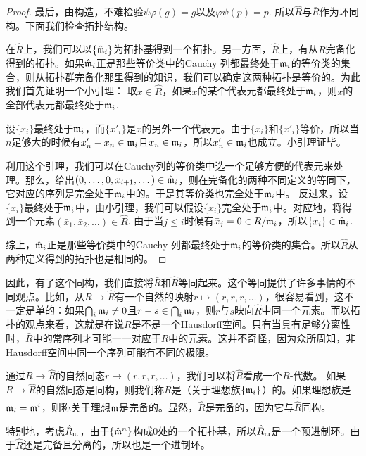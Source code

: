 \begin{proof}
	最后，由构造，不难检验$\psi\varphi(g)=g$以及$\varphi\psi(p)=p$. 所以$\hat R$与$\bar R$作为环同构。下面我们检查拓扑结构。

	在$\hat R$上，我们可以以$\{\hat {\mathfrak{m}}_i\}$为拓扑基得到一个拓扑。另一方面，$\hat R$上，有从$R$完备化得到的拓扑。如果$\hat {\mathfrak{m}}_i$正是那些等价类中的Cauchy 列都最终处于$\mathfrak{m}_i$的等价类的集合，则从拓扑群完备化那里得到的知识，我们可以确定这两种拓扑是等价的。为此我们首先证明一个小引理：
	取$x\in \hat R$，如果$x$的某个代表元都最终处于$\mathfrak{m}_i$，则$x$的全部代表元都最终处于$\mathfrak{m}_i$.
	
	设$\{x_i\}$最终处于$\mathfrak{m}_i$，而$\{x'_i\}$是$x$的另外一个代表元。由于$\{x_i\}$和$\{x'_i\}$等价，所以当$n$足够大的时候有$x'_n-x_n\in \mathfrak{m}_i$且$x_n\in \mathfrak{m}_i$，所以$x'_n\in \mathfrak{m}_i$也成立。小引理证毕。
		
	利用这个引理，我们可以在Cauchy列的等价类中选一个足够方便的代表元来处理。那么，给出$(0,\dots,0,x_{i+1},\dots)\in \hat{\mathfrak{m}}_i$，则在完备化的两种不同定义的等同下，它对应的序列是完全处于$\mathfrak{m}_i$中的。于是其等价类也完全处于$\mathfrak{m}_i$中。
	反过来，设$\{x_i\}$最终处于$\mathfrak{m}_i$中，由小引理，我们可以假设$\{x_i\}$完全处于$\mathfrak{m}_i$中。对应地，将得到一个元素$(\bar{x}_1,\bar{x}_2,\dots)\in \hat{R}$. 由于当$j\leq i$时候有$\bar{x}_j=0 \in R/\mathfrak{m}_i$，所以$\{x_i\}\in \hat{\mathfrak{m}}_i$. 
		
	综上，$\hat {\mathfrak{m}}_i$正是那些等价类中的Cauchy 列都最终处于$\mathfrak{m}_i$的等价类的集合。所以$\hat R$从两种定义得到的拓扑也是相同的。
\end{proof}

因此，有了这个同构，我们直接将$\bar R$和$\hat R$等同起来。这个等同提供了许多事情的不同观点。比如，从$R\to \hat R$有一个自然的映射$r\mapsto (r,r,r,\dots)$，很容易看到，这不一定是单的：如果$\bigcap_i \mathfrak{m}_i\neq 0$且$r-s\in \bigcap_i \mathfrak{m}_i$，则$r$与$s$映向$\hat R$中同一个元素。而以拓扑的观点来看，这就是在说$R$是不是一个Hausdorff空间。只有当具有足够分离性时，$\bar R$中的常序列才可能一一对应于$R$中的元素。这并不奇怪，因为众所周知，非Hausdorff空间中同一个序列可能有不同的极限。

通过$R\to \hat R$的自然同态$r\mapsto (r,r,r,\dots)$，我们可以将$\hat R$看成一个$R$-代数。
如果$R\to \hat R$的自然同态是同构，则我们称$R$是（关于理想族$\{\mathfrak{m}_i\}$）的。如果理想族是$\mathfrak{m}_i=\mathfrak{m}^i$，则称关于理想$\mathfrak{m}$是完备的。显然，$\hat R$是完备的，因为它与$\hat{\hat R}$同构。

\begin{para}
特别地，考虑$\hat R_{\mathfrak{m}}$，由于$\{\hat {\mathfrak{m}}^n\}$构成$0$处的一个拓扑基，所以$\hat R_{\mathfrak{m}}$是一个预进制环。由于$\hat R$还是完备且分离的，所以也是一个进制环。
\end{para}

